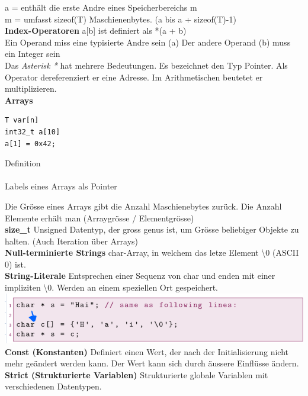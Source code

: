 \documentclass[7pt,landscape,a4paper]{scrartcl}
\begin{document}
\begin{multicols*}{4}
a = enthält die erste Andre eines Speicherbereichs m\\m = umfasst sizeof(T) Maschienenbytes. (a bis a + sizeof(T)-1) \\
\textbf{Index-Operatoren} a[b] ist definiert als *(a + b) \\
Ein Operand miss eine typisierte Andre sein (a)
Der andere Operand (b) muss ein Integer sein
\\ Das \textit{Asterisk *} hat mehrere Bedeutungen. Es bezeichnet den Typ Pointer. Als Operator dereferenziert er eine Adresse. Im Arithmetischen beutetet er multiplizieren.\\
\textbf{Arrays} \\
\begin{minipage}[b]{0,5\linewidth}
\begin{verbatim}
T var[n]
int32_t a[10]
a[1] = 0x42;
\end{verbatim}
\end{minipage}
\begin{minipage}[b]{0,5\linewidth}
Definition\\\\
Labels eines Arrays als Pointer
\end{minipage}
Die Grösse eines Arrays gibt die Anzahl Maschienebytes zurück. Die Anzahl Elemente erhält man (Arraygrösse / Elementgrösse)\\
\textbf{size\_t} Unsigned Datentyp, der gross genus ist, um Grösse beliebiger Objekte zu halten. (Auch Iteration über Arrays)\\
\textbf{Null-terminierte Strings} char-Array, in welchem das letze Element \textbackslash0  (ASCII 0) ist.\\
\textbf{String-Literale} Entsprechen einer Sequenz von char und enden mit einer impliziten \textbackslash0. Werden an einem speziellen Ort gespeichert.
\includegraphics[width=\linewidth]{stringliterale}\\
\textbf{Const (Konstanten)} Definiert einen Wert, der nach der Initialisierung nicht mehr geändert werden kann. Der Wert kann sich durch äussere Einflüsse ändern.\\
\textbf{Strict (Strukturierte Variablen)} Strukturierte globale Variablen mit verschiedenen Datentypen. \\

\end{multicols*}
\end{document}
